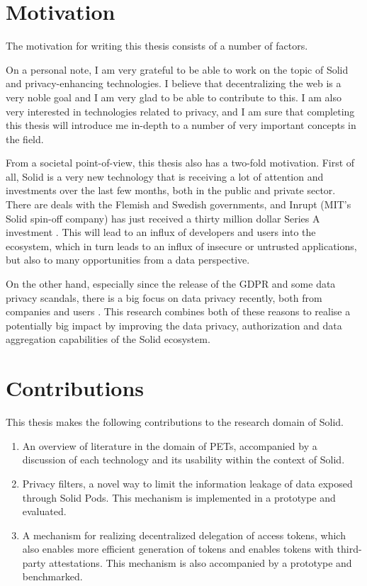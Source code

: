 \section{Motivation}
\label{sec:motivation}
The motivation for writing this thesis consists of a number of factors. 

On a personal note, I am very grateful to be able to work on the topic of Solid and privacy-enhancing technologies. I believe that decentralizing the web is a very noble goal and I am very glad to be able to contribute to this. I am also very interested in technologies related to privacy, and I am sure that completing this thesis will introduce me in-depth to a number of very important concepts in the field.

From a societal point-of-view, this thesis also has a two-fold motivation. First of all, Solid is a very new technology that is receiving a lot of attention and investments over the last few months, both in the public and private sector. There are deals with the Flemish  and Swedish  governments, and Inrupt (MIT's Solid spin-off company) has just received a thirty million dollar Series A investment . This will lead to an influx of developers and users into the ecosystem, which in turn leads to an influx of insecure or untrusted applications, but also to many opportunities from a data perspective. 

On the other hand, especially since the release of the GDPR and some data privacy scandals, there is a big focus on data privacy recently, both from companies and users . This research combines both of these reasons to realise a potentially big impact by improving the data privacy, authorization and data aggregation capabilities of the Solid ecosystem. 

\section{Contributions}
\label{sec:contributions}
This thesis makes the following contributions to the research domain of Solid.
\begin{enumerate}
    \item An overview of literature in the domain of \acrlong{PETs}, accompanied by a discussion of each technology and its usability within the context of Solid.
    \item Privacy filters, a novel way to limit the information leakage of data exposed through Solid Pods. This mechanism is implemented in a prototype and evaluated.
    \item A mechanism for realizing decentralized delegation of access tokens, which also enables more efficient generation of tokens and enables tokens with third-party attestations. This mechanism is also accompanied by a prototype and benchmarked.
\end{enumerate}

